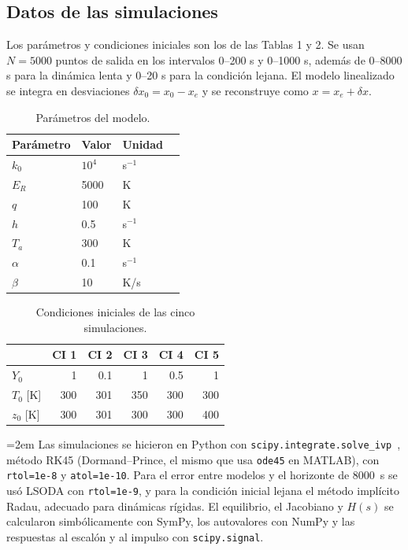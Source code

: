 \documentclass[11pt,a4paper]{article}
\begin{document}
\subsection{Datos de las simulaciones}
Los parámetros y condiciones iniciales son los de las Tablas 1 y 2. Se usan $N=5000$ puntos de salida en los intervalos 0--200 s y 0--1000 s, además de 0--8000 s para la dinámica lenta y 0--20 s para la condición lejana. El modelo linealizado se integra en desviaciones $\delta x_0=x_0-x_e$ y se reconstruye como $x=x_e+\delta x$.
\begin{table}[H]\centering\caption{Parámetros del modelo.}\begin{tabular}{llll}\toprule Parámetro&Valor&Unidad\\\midrule $k_0$&$10^4$&s$^{-1}$\\$E_R$&5000&K\\$q$&100&K\\$h$&0.5&s$^{-1}$\\$T_a$&300&K\\$\alpha$&0.1&s$^{-1}$\\$\beta$&10&K/s\\\bottomrule\end{tabular}\end{table}
\begin{table}[H]\centering\caption{Condiciones iniciales de las cinco simulaciones.}\begin{tabular}{lrrrrr}\toprule &CI 1&CI 2&CI 3&CI 4&CI 5\\\midrule $Y_0$&1&0.1&1&0.5&1\\$T_0$ [K]&300&301&350&300&300\\$z_0$ [K]&300&301&300&300&400\\\bottomrule\end{tabular}\end{table}
\emergencystretch=2em Las simulaciones se hicieron en Python con \texttt{scipy.integrate.solve\_ivp}~\cite{SciPy}, método RK45 (Dormand--Prince, el mismo que usa \texttt{ode45} en MATLAB), con \texttt{rtol=1e-8} y \texttt{atol=1e-10}. Para el error entre modelos y el horizonte de 8000~s se usó LSODA con \texttt{rtol=1e-9}, y para la condición inicial lejana el método implícito Radau, adecuado para dinámicas rígidas. El equilibrio, el Jacobiano y $H(s)$ se calcularon simbólicamente con SymPy, los autovalores con NumPy y las respuestas al escalón y al impulso con \texttt{scipy.signal}.
\end{document}
